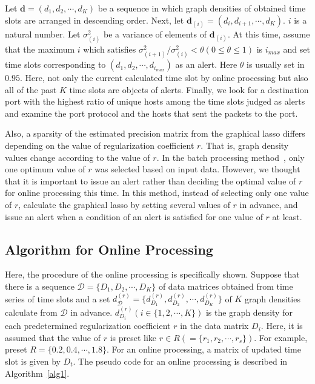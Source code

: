 \documentclass{sig-alternate-10pt}
\begin{document}
Let $\bm{d} = (d_{1}, d_{2}, \cdots, d_{K})$ be a sequence in which graph densities of obtained time slots are arranged in descending order.
Next, let $\bm{d}_{(i)} = (d_{i}, d_{i+1},\cdots,d_{K})$.
$i$ is a natural number.
Let $\sigma^{2}_{(i)}$ be a variance of elements of $\bm{d}_{(i)}$.
At this time, assume that the maximum $i$ which satisfies $\sigma^{2}_{(i+1)}/\sigma^{2}_{(i)}<\theta (0\leq \theta \leq 1)$ is $i_{max}$ and set time slots corresponding to $(d_{1},d_{2},\cdots,d_{i_{max}})$ as an alert.
Here $\theta$ is usually set in $0.95$.
Here, not only the current calculated time slot by online processing but also all of the past $K$ time slots are objects of alerts.
Finally, we look for a destination port with the highest ratio of unique hosts among the time slots judged as alerts and examine the port protocol and the hosts that sent the packets to the port.

Also, a sparsity of the estimated precision matrix from the graphical lasso differs depending on the value of regularization coefficient $r$.
That is, graph density values change according to the value of $r$.
In the batch processing method~\cite{Han}, only one optimum value of $r$ was selected based on input data.
However, we thought that it is important to issue an alert rather than deciding the optimal value of $r$ for online processing this time.
In this method, instead of selecting only one value of $r$, calculate the graphical lasso by setting several values of $r$ in advance, and issue an alert when a condition of an alert is satisfied for one value of $r$ at least.


\subsection{Algorithm for Online Processing}
Here, the procedure of the online processing is specifically shown.
Suppose that there is a sequence $\mathcal{D}=\{D_1, D_2, \cdots, D_K\}$ of data matrices obtained from time series of time slots and a set $d_{\mathcal{D}}^{(r)}=\{d^{(r)}_{D_1}, d^{(r)}_{D_2}, \cdots, d^{(r)}_{D_K}\}$ of $K$ graph densities calculate from $\mathcal{D}$ in advance.
$d^{(r)}_{D_i} (i \in \{1, 2, \cdots, K\})$ is the graph density for each predetermined regularization coefficient $r$ in the data matrix $D_i$.
Here, it is assumed that the value of $r$ is preset like $r \in R ( =\{r_1, r_2, \cdots, r_s\} )$.
For example, preset $R=\{0.2, 0.4, \cdots, 1.8\}$.
For an online processing, a matrix of updated time slot is given by $D_t$.
The pseudo code for an online processing is described in Algorithm~\ref{alg1}.
\end{document}
